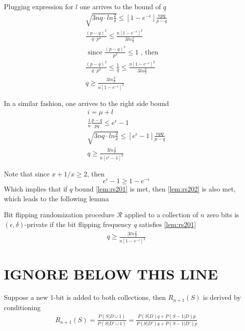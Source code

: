 \documentclass[11pt]{article}
\newcommand{\cR}{\mathcal{R}}
\begin{document}
Plugging expression for $l$ one arrives to the bound of $q$
\begin{align}
\sqrt{3nq \cdot ln\frac{2}{\delta}} \le \left [ 1 - e^{-\epsilon}\right ] \frac { npq}{p - q} \\
 \frac {(p - q)^2} {q \cdot p^2} \le   \frac { n \left [ 1 - e^{-\epsilon}\right ]^2 } { 3  ln\frac{2}{\delta}}  \\
 \text{ since }  \frac {(p - q)^2} { p^2} \le 1 \text{ , then }  \\
  \frac {(p - q)^2} {q \cdot p^2} \le \frac{1}{q}  \le   \frac { n \left [ 1 - e^{-\epsilon}\right ]^2 } { 3  ln\frac{2}{\delta}}  \\
  q \ge  \frac { 3  ln\frac{2}{\delta}} { n \left [ 1 - e^{-\epsilon}\right ]^2 } \label{lem:rs201}
\end{align}

In a similar fashion, one arrives to the right side bound
\begin{align}
i = \mu + l \\
\frac{l}{n} \frac{p-q}{pq}  \le e^\epsilon - 1 \\
\sqrt{3nq \cdot ln\frac{2}{\delta}} \le \left [ e^\epsilon - 1  \right ] \frac { npq}{p - q} \\
  q \ge  \frac { 3  ln\frac{2}{\delta}} { n \left [ e^{\epsilon} - 1\right ]^2 }  \label{lem:rs202}
\end{align}

Note that since $x + 1/x \ge 2$, then 
\[ e^{\epsilon} - 1 \ge 1 - e^{-\epsilon} \]
Which implies that if $q$ bound  \eqref{lem:rs201} is met, then \eqref{lem:rs202} is also met, which leads to the following lemma
 \begin{lem} \label{lem:rs1}
 Bit flipping randomization procedure $\cR$ applied to a collection of $n$ zero bits is $(\epsilon, \delta)$-private if the bit flipping frequency $q$ satisfies \eqref{lem:rs201}
 \begin{align*}
  q \ge  \frac { 3  ln\frac{2}{\delta}} { n \left [ 1 - e^{-\epsilon}\right ]^2 }\end{align*}
\end{lem}

 \newpage
 \section{IGNORE BELOW THIS LINE}
 
 Suppose a new 1-bit is added to both collections, then $R_{n+1}(S)$ is derived by conditioning
 \begin{align*}
R_{n+1}(S) = \frac{ P(S|D \cup 1) }{ P(S|D' \cup 1) } = \frac { P(S|D)q + P(S-1|D)p } { P(S|D')q + P(S-1|D')p}
\end{align*}
 
\end{document}
